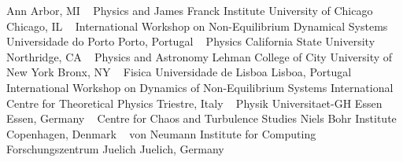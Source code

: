     \newline
Ann Arbor, MI
\newline
~
\Gap
{}
Physics and James Franck Institute
\newline
    University of Chicago
    \newline
Chicago, IL
\newline
~
\Gap
{}
International Workshop on Non-Equilibrium Dynamical Systems
\newline
    Universidade do Porto
    \newline
Porto, Portugal
\newline
~
\Gap
{}
Physics
\newline
    California State University
    \newline
Northridge, CA
\newline
~
\Gap
{}
Physics and Astronomy
\newline
    Lehman College of City University of New York
    \newline
Bronx, NY
\newline
~
\Gap
{}
Fisica
\newline
    Universidade de Lisboa
    \newline
Lisboa, Portugal
\newline
~
\Gap
{}
International Workshop on Dynamics of Non-Equilibrium Systems
\newline
    International Centre for Theoretical Physics
    \newline
Triestre, Italy
\newline
~
\Gap
{}
Physik
\newline
    Universitaet-GH Essen
    \newline
Essen, Germany
\newline
~
\Gap
{}
Centre for Chaos and Turbulence Studies
\newline
    Niels Bohr Institute
    \newline
Copenhagen, Denmark
\newline
~
\Gap
{}
von Neumann Institute for Computing
\newline
    Forschungszentrum Juelich
    \newline
Juelich, Germany
